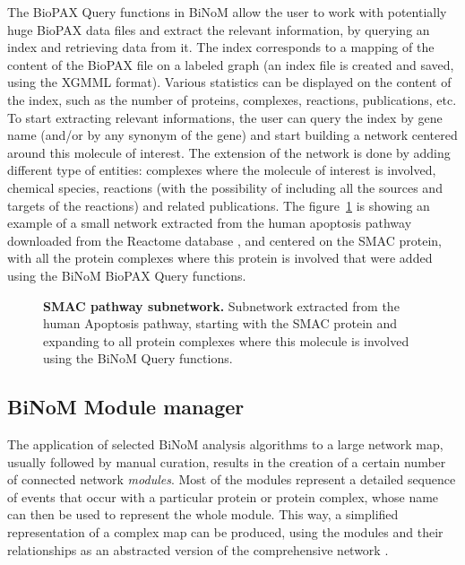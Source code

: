\documentclass[10pt]{bmc_article}
\newenvironment{bmcformat}{\baselineskip20pt\sloppy\setboolean{publ}{false}}{\baselineskip20pt\sloppy}
\begin{document}
\begin{bmcformat}
The BioPAX Query functions in BiNoM allow the user to work with potentially huge
BioPAX data files and extract the relevant information, by querying an index and
retrieving data from it. The index corresponds to a mapping of the content of
the BioPAX file on a labeled graph (an index file is created and saved, using
the XGMML format). Various statistics can be displayed on the content of the
index, such as the number of proteins, complexes, reactions, publications, etc.
To start extracting relevant informations, the user can query the index by gene
name (and/or by any synonym of the gene) and start building a network centered
around this molecule of interest. The extension of the network is done by adding
different type of entities: complexes where the molecule of interest is
involved, chemical species, reactions (with the possibility of including all the
sources and targets of the reactions) and related publications. The figure~\ref{smaccomplexes}
is showing an example of a small network extracted from the human apoptosis
pathway downloaded from the Reactome database \cite{joshi2005reactome}, and
centered on the SMAC protein, with all the protein complexes where
this protein is involved that were added using the BiNoM BioPAX Query functions.


\begin{figure}[h]
 \caption{\label{smaccomplexes}  \textbf{SMAC pathway subnetwork.}
      Subnetwork extracted from the human Apoptosis pathway, starting with the
SMAC protein and expanding to all protein complexes where this
molecule is involved using the BiNoM Query functions.}
\end{figure}


\subsection*{BiNoM Module manager}
The application of selected BiNoM analysis algorithms to a large network map,
usually followed by manual curation, results in the creation of a certain number
of connected network \emph{modules}. Most of the modules represent a detailed
sequence of events that occur with a particular protein or protein complex,
whose name can then be used to represent the whole module. This way, a
simplified representation of a complex map can be produced, using the modules
and their relationships as an abstracted version of the comprehensive network
\cite{calzone2008comprehensive}.


\end{bmcformat}
\end{document}
